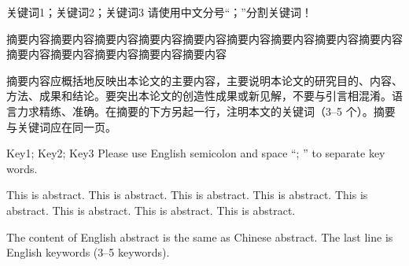 
\begin{cnabstract}{关键词1；关键词2；关键词3}
  请使用中文分号“；”分割关键词！

  摘要内容摘要内容摘要内容摘要内容摘要内容摘要内容摘要内容摘要内容摘要内容摘要内容摘要内容摘要内容摘要内容摘要内容

  摘要内容应概括地反映出本论文的主要内容，主要说明本论文的研究目的、内容、方法、成果和结论。要突出本论文的创造性成果或新见解，不要与引言相混淆。语言力求精练、准确。在摘要的下方另起一行，注明本文的关键词（3--5 个）。摘要与关键词应在同一页。
\end{cnabstract}


\begin{enabstract}{Key1; Key2; Key3}
  Please use English semicolon and space ``; '' to separate key words.

  This is abstract. This is abstract. This is abstract. This is abstract. This is abstract. This is abstract. This is abstract. This is abstract.

  The content of English abstract is the same as Chinese abstract. The last line is English keywords (3--5 keywords).
\end{enabstract}
